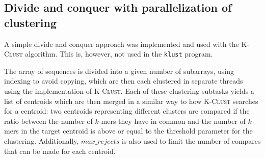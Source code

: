 \subsection{Divide and conquer with parallelization of clustering}

A simple divide and conquer approach was implemented and used with the
\textsc{K-Clust} algorithm. This is, however, not used in the \texttt{klust}
program.

The array of sequences is divided into a given number of subarrays, using
indexing to avoid copying, which are then each clustered in separate threads
using the implementation of \textsc{K-Clust}.  Each of these clustering
subtasks yields a list of centroids which are then merged in a similar way to
how \textsc{K-Clust} searches for a centroid: two centroids representing
different clusters are compared if the ratio between the number of $k$-mers
they have in common and the number of $k$-mers in the target centroid is above
or equal to the threshold parameter for the clustering. Additionally,
$max\_rejects$ is also used to limit the number of compares that can be made
for each centroid.
